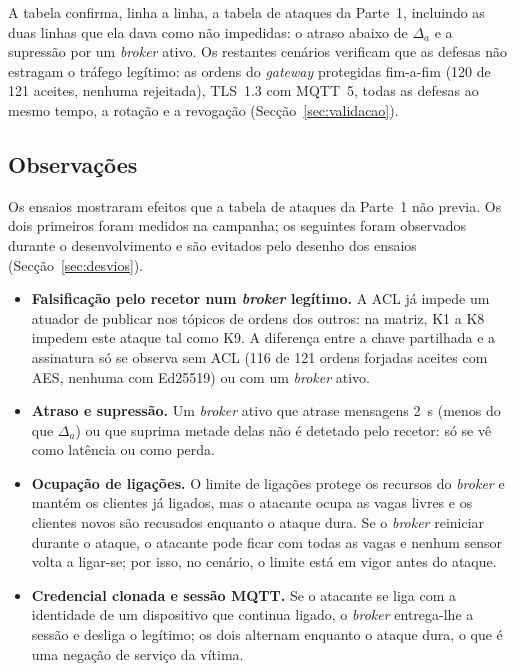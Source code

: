 
A tabela confirma, linha a linha, a tabela de ataques da Parte~1, incluindo as
duas linhas que ela dava como não impedidas: o atraso abaixo de $\Delta_a$ e a
supressão por um \emph{broker} ativo. Os restantes cenários verificam que as
defesas não estragam o tráfego legítimo: as ordens do \emph{gateway} protegidas
fim-a-fim (120 de 121 aceites, nenhuma rejeitada), TLS~1.3 com
MQTT~5, todas as
defesas ao mesmo tempo, a rotação e a revogação (Secção~\ref{sec:validacao}).

\subsection{Observações}
\label{sec:observacoes}

Os ensaios mostraram efeitos que a tabela de ataques da Parte~1 não previa. Os
dois primeiros foram medidos na campanha; os  seguintes foram observados
durante o desenvolvimento e são evitados pelo desenho dos ensaios
(Secção~\ref{sec:desvios}).

\begin{itemize}[leftmargin=*]
  \item \textbf{Falsificação pelo recetor num \emph{broker} legítimo.} A ACL já
    impede um atuador de publicar nos tópicos de ordens dos outros: na matriz,
    K1 a K8 impedem este ataque tal como K9. A diferença entre a chave partilhada
    e a assinatura só se observa sem ACL (116 de 121 ordens forjadas aceites com
    AES, nenhuma com Ed25519) ou com um \emph{broker} ativo.
  \item \textbf{Atraso e supressão.} Um \emph{broker} ativo que atrase mensagens
    2~s (menos do que $\Delta_a$) ou que suprima metade delas não é detetado pelo
    recetor: só se vê como latência ou como perda.
  \item \textbf{Ocupação de ligações.} O limite de ligações protege os recursos do
    \emph{broker} e mantém os clientes já ligados, mas o atacante ocupa as vagas
    livres e os clientes novos são recusados enquanto o ataque dura. Se o
    \emph{broker} reiniciar durante o ataque, o atacante pode ficar com todas as
    vagas e nenhum sensor volta a ligar-se; por isso, no cenário, o limite está em
    vigor antes do ataque.
  \item \textbf{Credencial clonada e sessão MQTT.} Se o atacante se liga com a
    identidade de um dispositivo que continua ligado, o \emph{broker} entrega-lhe
    a sessão e desliga o legítimo; os dois alternam enquanto o ataque dura, o que
    é uma negação de serviço da vítima.
\end{itemize}
